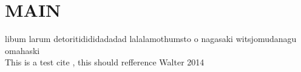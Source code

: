 \section{MAIN}
libum larum detoritidididadadad lalalamothumsto o nagasaki witsjomudanagu omahaski \\
This is a test cite \cite{Walter:2014}, this should refference Walter 2014
